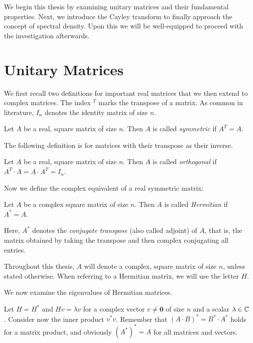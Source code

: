 We begin this thesis by examining unitary matrices and their fundamental properties.
Next, we introduce the Cayley transform to finally approach the concept of spectral density.
Upon this we will be well-equipped to proceed with the investigation afterwards.

\section{Unitary Matrices}

We first recall two definitions for important real matrices that we then extend to complex matrices.
The index $^T$ marks the transpose of a matrix.
As common in literature, $I_n$ denotes the identity matrix of size $n$.

\begin{definition}
    Let $A$ be a real, square matrix of size $n$.
    Then $A$ is called \emph{symmetric} if $A^T = A$.
\end{definition}

The following definition is for matrices with their transpose as their inverse.

\begin{definition}
    Let $A$ be a real, square matrix of size $n$.
    Then $A$ is called \emph{orthogonal} if $A^T \cdot A = A \cdot A^T = I_n$.
\end{definition}


Now we define the complex equivalent of a real symmetric matrix:

\begin{definition}
    Let $A$ be a complex square matrix of size $n$.
    Then $A$ is called \emph{Hermitian} if $A^* = A$.
\end{definition}

Here, $A^*$ denotes the \emph{conjugate transpose} (also called adjoint) of $A$, that is,
the matrix obtained by taking the transpose and then complex conjugating all entries.

Throughout this thesis, $A$ will denote a complex, square matrix of size $n$, unless stated otherwise.
When referring to a Hermitian matrix, we will use the letter $H$.

We now examine the eigenvalues of Hermitian matrices.

Let $H = H^*$ and $H v = \lambda v$ for a complex vector $v \neq \mathbf{0}$ of size $n$ and a scalar $\lambda \in \mathbb{C}$.
Consider now the inner product $ v^* v$.
Remember that $(A \cdot B)^* = B^* \cdot A^*$ holds for a matrix product,
and obviously ${(A^*)^*} = A$ for all matrices and vectors.

